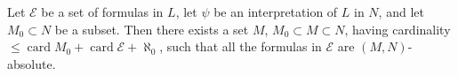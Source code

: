 Let $\mathcal{E}$ be a set of formulas in $L$, let $\psi$ be an interpretation of $L$ in $N$, and let $M_0 \subset N$ be a subset. Then there exists a set $M$, $M_0 \subset M \subset N$, having cardinality $\leqslant \operatorname{card} M_0 + \operatorname{card} \mathcal{E} + \aleph_0$, such that all the formulas in $\mathcal{E}$ are $(M, N)$-absolute.

